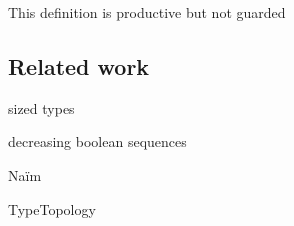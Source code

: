 This definition is productive but not guarded

\subsection{Related work}

sized types

decreasing boolean sequences

Naïm

TypeTopology
